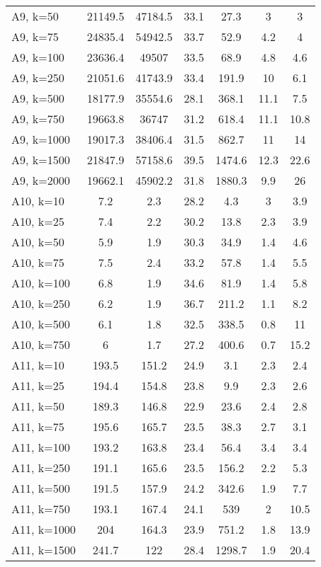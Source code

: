 \documentclass{article}
\begin{document}
\begin{center}
\begin{table}[h]
\begin{tabular}{|l||c|c|c|c|c|c|}
    A9, k=50 & 21149.5 & 47184.5 & 33.1 & 27.3 & 3 & 3\\
    A9, k=75 & 24835.4 & 54942.5 & 33.7 & 52.9 & 4.2 & 4\\
    A9, k=100 & 23636.4 & 49507 & 33.5 & 68.9 & 4.8 & 4.6\\
    A9, k=250 & 21051.6 & 41743.9 & 33.4 & 191.9 & 10 & 6.1\\
    A9, k=500 & 18177.9 & 35554.6 & 28.1 & 368.1 & 11.1 & 7.5\\
    A9, k=750 & 19663.8 & 36747 & 31.2 & 618.4 & 11.1 & 10.8\\
    A9, k=1000 & 19017.3 & 38406.4 & 31.5 & 862.7 & 11 & 14\\
    A9, k=1500 & 21847.9 & 57158.6 & 39.5 & 1474.6 & 12.3 & 22.6\\
A9, k=2000 & 19662.1 & 45902.2 & 31.8 & 1880.3 & 9.9 & 26\\
    \hline
    A10, k=10 & 7.2 & 2.3 & 28.2 & 4.3 & 3 & 3.9\\
    A10, k=25 & 7.4 & 2.2 & 30.2 & 13.8 & 2.3 & 3.9\\
    A10, k=50 & 5.9 & 1.9 & 30.3 & 34.9 & 1.4 & 4.6\\
    A10, k=75 & 7.5 & 2.4 & 33.2 & 57.8 & 1.4 & 5.5\\
    A10, k=100 & 6.8 & 1.9 & 34.6 & 81.9 & 1.4 & 5.8\\
    A10, k=250 & 6.2 & 1.9 & 36.7 & 211.2 & 1.1 & 8.2\\
    A10, k=500 & 6.1 & 1.8 & 32.5 & 338.5 & 0.8 & 11\\
    A10, k=750 & 6 & 1.7 & 27.2 & 400.6 & 0.7 & 15.2\\
    \hline
    A11, k=10 & 193.5 & 151.2 & 24.9 & 3.1 & 2.3 & 2.4\\
    A11, k=25 & 194.4 & 154.8 & 23.8 & 9.9 & 2.3 & 2.6\\
    A11, k=50 & 189.3 & 146.8 & 22.9 & 23.6 & 2.4 & 2.8\\
    A11, k=75 & 195.6 & 165.7 & 23.5 & 38.3 & 2.7 & 3.1\\
    A11, k=100 & 193.2 & 163.8 & 23.4 & 56.4 & 3.4 & 3.4\\
    A11, k=250 & 191.1 & 165.6 & 23.5 & 156.2 & 2.2 & 5.3\\
    A11, k=500 & 191.5 & 157.9 & 24.2 & 342.6 & 1.9 & 7.7\\
    A11, k=750 & 193.1 & 167.4 & 24.1 & 539 & 2 & 10.5\\
    A11, k=1000 & 204 & 164.3 & 23.9 & 751.2 & 1.8 & 13.9\\
    A11, k=1500 & 241.7 & 122 & 28.4 & 1298.7 & 1.9 & 20.4\\

\end{tabular}
\end{table}
\end{center}
\end{document}
